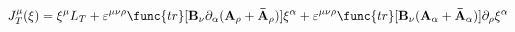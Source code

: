 \begin{equation}
J_T^{\mu }(\xi )=\xi ^{\mu }L_{T}+\varepsilon ^{\mu \nu \rho }
\func{tr}[{\bf B}_{\nu }\partial _{\alpha }({\bf A}_{\rho }+{\bf
\bar{A}}_{\rho })]\xi^{\alpha }+\varepsilon ^{\mu \nu \rho }
\func{tr}[{\bf B}_{\nu }({\bf A}_{\alpha }+{\bf \bar{A}}_{\alpha
})]\partial _{\rho }\xi ^{\alpha } \label{eqn:19}
\end{equation}

